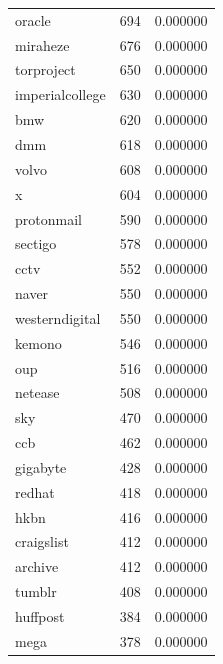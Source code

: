 \begin{tabular}{lrr}
oracle & 694 & 0.000000 \\
miraheze & 676 & 0.000000 \\
torproject & 650 & 0.000000 \\
imperialcollege & 630 & 0.000000 \\
bmw & 620 & 0.000000 \\
dmm & 618 & 0.000000 \\
volvo & 608 & 0.000000 \\
x & 604 & 0.000000 \\
protonmail & 590 & 0.000000 \\
sectigo & 578 & 0.000000 \\
cctv & 552 & 0.000000 \\
naver & 550 & 0.000000 \\
westerndigital & 550 & 0.000000 \\
kemono & 546 & 0.000000 \\
oup & 516 & 0.000000 \\
netease & 508 & 0.000000 \\
sky & 470 & 0.000000 \\
ccb & 462 & 0.000000 \\
gigabyte & 428 & 0.000000 \\
redhat & 418 & 0.000000 \\
hkbn & 416 & 0.000000 \\
craigslist & 412 & 0.000000 \\
archive & 412 & 0.000000 \\
tumblr & 408 & 0.000000 \\
huffpost & 384 & 0.000000 \\
mega & 378 & 0.000000 \\
\bottomrule
\end{tabular}
